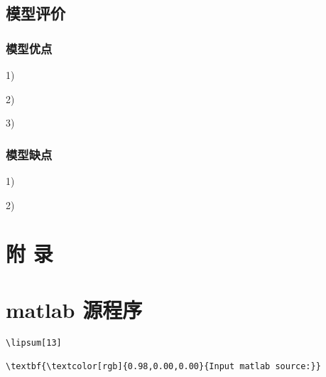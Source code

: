 \documentclass[nocover]{cumcmart}%
\begin{document}
\subsection{模型评价}
\subsubsection{模型优点}
1)	

2)	

3)	

\subsubsection{模型缺点}
1)	

2)	





\newpage
\appendix
\section*{附 \quad 录}

\section{matlab 源程序}
\begin{lstlisting}
\lipsum[13]

\textbf{\textcolor[rgb]{0.98,0.00,0.00}{Input matlab source:}}



\end{lstlisting}
\end{document}
